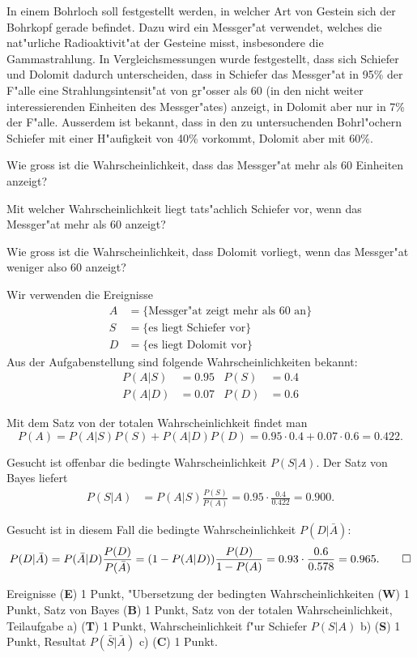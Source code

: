 In einem Bohrloch soll festgestellt werden, in welcher Art von Gestein
sich der Bohrkopf gerade befindet. Dazu wird ein Messger"at verwendet, welches
die nat"urliche Radioaktivit"at der Gesteine misst, insbesondere die
Gammastrahlung.
In Vergleichsmessungen wurde festgestellt, dass sich Schiefer
und Dolomit dadurch unterscheiden, dass in Schiefer das Messger"at
in 95\% der F"alle eine Strahlungsintensit"at von gr"osser als 60 (in den
nicht weiter interessierenden Einheiten des Messger"ates) anzeigt,
in Dolomit aber nur in 7\% der F"alle.
Ausserdem ist bekannt, dass in den zu untersuchenden Bohrl"ochern
Schiefer mit einer H"aufigkeit von 40\% vorkommt, Dolomit aber mit 60\%.
\begin{teilaufgaben}
\item
Wie gross ist die Wahrscheinlichkeit, dass das Messger"at mehr als 60
Einheiten anzeigt?
\item
Mit welcher Wahrscheinlichkeit liegt tats"achlich Schiefer vor, wenn 
das Messger"at mehr als 60 anzeigt?
\item
Wie gross ist die Wahrscheinlichkeit, dass Dolomit vorliegt, wenn
das Messger"at weniger also 60 anzeigt?
\end{teilaufgaben}


\begin{loesung}
Wir verwenden die Ereignisse
\begin{align*}
A&=\{\text{Messger"at zeigt mehr als 60 an}\}\\
S&=\{\text{es liegt Schiefer vor}\}\\
D&=\{\text{es liegt Dolomit vor}\}
\end{align*}
Aus der Aufgabenstellung sind folgende Wahrscheinlichkeiten bekannt:
\begin{align*}
P(A|S)&=0.95&
P(S)&=0.4\\
P(A|D)&=0.07&
P(D)&=0.6
\end{align*}
\begin{teilaufgaben}
\item Mit dem Satz von der totalen Wahrscheinlichkeit findet man
\[
P(A)=P(A|S)P(S)+P(A|D)P(D)=0.95\cdot 0.4+0.07\cdot 0.6=0.422.
\]
\item Gesucht ist offenbar die bedingte Wahrscheinlichkeit $P(S|A)$. Der
Satz von Bayes liefert
\begin{align*}
P(S|A)&=P(A|S)\frac{P(S)}{P(A)}=0.95\cdot\frac{0.4}{0.422}=0.900.
\end{align*}
\item
Gesucht ist in diesem Fall die bedingte Wahrscheinlichkeit $P(D|\bar A)$:
\[
P(D|\bar A)=P(\bar A|D)\frac{P(D)}{P(\bar A)}
=(1-P(A|D))\frac{P(D)}{1-P(A)}=0.93 \cdot \frac{0.6}{0.578}=0.965.
\qedhere
\]
\end{teilaufgaben}
\end{loesung}


\begin{bewertung}
Ereignisse ({\bf E}) 1 Punkt,
"Ubersetzung der bedingten Wahrscheinlichkeiten ({\bf W}) 1 Punkt,
Satz von Bayes ({\bf B}) 1 Punkt,
Satz von der totalen Wahrscheinlichkeit, Teilaufgabe a) ({\bf T}) 1 Punkt,
Wahrscheinlichkeit f"ur Schiefer $P(S|A)$ b) ({\bf S}) 1 Punkt,
Resultat $P(\bar S|\bar A)$ c) ({\bf C}) 1 Punkt.
\end{bewertung}


